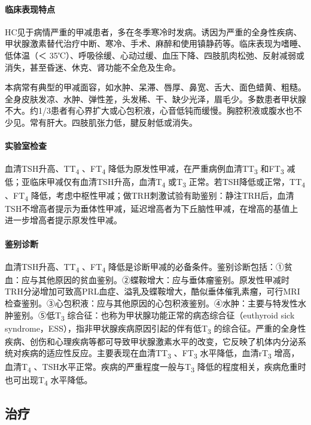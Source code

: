 \paragraph{临床表现特点}

HC见于病情严重的甲减患者，多在冬季寒冷时发病。诱因为严重的全身性疾病、甲状腺激素替代治疗中断、寒冷、手术、麻醉和使用镇静药等。临床表现为嗜睡、低体温（＜
35℃）、呼吸徐缓、心动过缓、血压下降、四肢肌肉松弛、反射减弱或消失，甚至昏迷、休克、肾功能不全危及生命。

本病常有典型的甲减面容，如水肿、呆滞、唇厚、鼻宽、舌大、面色蜡黄、粗糙。全身皮肤发凉、水肿、弹性差，头发稀、干、缺少光泽，眉毛少。多数患者甲状腺不大。约1/3患者有心界扩大或心包积液，心音低钝而缓慢。胸腔积液或腹水也不少见。常有肝大。四肢肌张力低，腱反射低或消失。

\paragraph{实验室检查}

血清TSH升高、TT\textsubscript{4} 、FT\textsubscript{4}
降低为原发性甲减，在严重病例血清TT\textsubscript{3}
和FT\textsubscript{3}
减低；亚临床甲减仅有血清TSH升高，血清T\textsubscript{4}
或T\textsubscript{3} 正常。若TSH降低或正常，TT\textsubscript{4}
、FT\textsubscript{4}
降低，考虑中枢性甲减；做TRH刺激试验有助鉴别：静注TRH后，血清TSH不增高者提示为垂体性甲减，延迟增高者为下丘脑性甲减，在增高的基值上进一步增高者提示原发性甲减。

\paragraph{鉴别诊断}

血清TSH升高、TT\textsubscript{4} 、FT\textsubscript{4}
降低是诊断甲减的必备条件。鉴别诊断包括：①贫血：应与其他原因的贫血鉴别。②蝶鞍增大：应与垂体瘤鉴别。原发性甲减时TRH分泌增加可致高PRL血症、溢乳及蝶鞍增大，酷似垂体催乳素瘤，可行MRI检查鉴别。③心包积液：应与其他原因的心包积液鉴别。④水肿：主要与特发性水肿鉴别。⑤低T\textsubscript{3}
综合征：也称为甲状腺功能正常的病态综合征（euthyroid sick
syndrome，ESS），指非甲状腺疾病原因引起的伴有低T\textsubscript{3}
的综合征。严重的全身性疾病、创伤和心理疾病等都可导致甲状腺激素水平的改变，它反映了机体内分泌系统对疾病的适应性反应。主要表现在血清TT\textsubscript{3}
、FT\textsubscript{3} 水平降低，血清rT\textsubscript{3}
增高，血清T\textsubscript{4}
、TSH水平正常。疾病的严重程度一般与T\textsubscript{3}
降低的程度相关，疾病危重时也可出现T\textsubscript{4} 水平降低。

\subsection{治疗}

